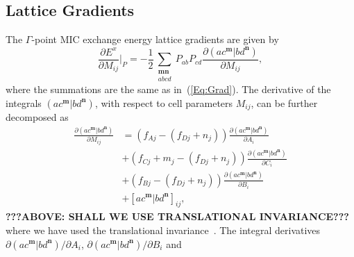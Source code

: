 \documentclass[prl,twocolumn,showpacs,twocolumngrid,superbib]{revtex4}
\begin{document}
\subsection{Lattice Gradients}
The $\Gamma$-point MIC exchange energy lattice gradients are given by
\begin{equation}\label{Eq:Xstress}
  \frac{\partial E^x}{\partial M_{ij}}\bigg|_P=
  -\frac{1}{2}\sum_{\substack{\mathbf{m}\mathbf{n}\\a b c d}}P_{ab}P_{cd}
  \frac{\partial(ac^\mathbf{m}|bd^\mathbf{n})}{\partial M_{ij}},
\end{equation}
where the summations are the same as in~(\ref{Eq:Grad}).
The derivative of the integrals $(ac^\mathbf{m}|bd^\mathbf{n})$, with respect 
to cell parameters $M_{ij}$, can be further decomposed as
\begin{equation}\label{Eq:DerMij}
  \begin{split}
    \frac{\partial (ac^\mathbf{m}|bd^\mathbf{n})}{\partial M_{ij}}
    &=(f_{Aj}-(f_{Dj}+n_j))\frac{\partial (ac^\mathbf{m}|bd^\mathbf{n})}{\partial A_{i}}\\
    &+(f_{Cj}+m_j-(f_{Dj}+n_j))\frac{\partial (ac^\mathbf{m}|bd^\mathbf{n})}{\partial C_{i}}\\
    &+(f_{Bj}-(f_{Dj}+n_j))\frac{\partial (ac^\mathbf{m}|bd^\mathbf{n})}{\partial B_{i}}\\
    &+[ac^\mathbf{m}|bd^\mathbf{n}]_{ij},
  \end{split}
\end{equation}
{\bf ???ABOVE: SHALL WE USE TRANSLATIONAL INVARIANCE???}\\
where we have used the translational invariance~\cite{AKorminicki77}. 
The integral derivatives $\partial (ac^\mathbf{m}|bd^\mathbf{n})/\partial A_{i}$, 
$\partial (ac^\mathbf{m}|bd^\mathbf{n})/\partial B_{i}$ and 
\end{document}
